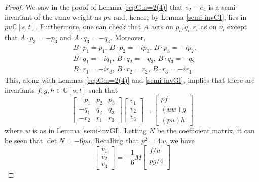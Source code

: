 \documentclass[a4paper,reqno]{amsart}
\theoremstyle{definition}
\theoremstyle{remark} \newtheorem{remark}[theorem]{Remark}
\numberwithin{equation}{section}
\begin{document}
\begin{proof}
    We saw in the proof of Lemma \ref{repG:n=2(4)} that \(e_2 - e_4\) is a semi-invariant of the same weight as \(pu\) and, hence, by Lemma \ref{semi-invGI}, lies in \(pu \mathbb{C}[s,t]\). Furthermore, one can check that \(A\) acts on \(p_i, q_i, r_i\) as on \(v_i\) except that \(A \cdot p_3 = -p_3\) and \(A\cdot q_3 = -q_3\). Moreover,
    \begin{align*}
        &B\cdot p_1 = p_1,\, B\cdot p_2 = -ip_3,\, B\cdot p_3 = -ip_2, \\
        &B\cdot q_1 = -iq_1,\, B\cdot q_2 = -q_3,\, B\cdot q_3 = -q_2 \\
        &B\cdot r_1 = -ir_3,\, B\cdot r_2 = r_2,\, B\cdot r_3 = -ir_1.
    \end{align*}
    This, along with Lemmas \ref{repG:n=2(4)} and \ref{semi-invGI}, implies that there are invariants \(f, g, h \in \mathbb{C}[s,t]\) such that 
    \begin{equation*}
        \begin{bmatrix}
            -p_1 & p_2 & p_3 \\
            -q_1 & q_2 & q_3 \\
            -r_2 & r_1 & r_3
        \end{bmatrix}
        \begin{bmatrix}
            v_1 \\
            v_2 \\
            v_3
        \end{bmatrix}
        =
        \begin{bmatrix}
            pf \\
            (uw)g \\
            (pu)h
        \end{bmatrix}
    \end{equation*}
    where \(w\) is as in Lemma \ref{semi-invGI}. Letting \(N\) be the coefficient matrix, it can be seen that \(\det N = -6pu\). Recalling that \(p^2 = 4w\), we have
    \begin{equation*}
        \begin{bmatrix}
            v_1 \\
            v_2 \\
            v_3
        \end{bmatrix}
        = -\frac{1}{6}M
        \begin{bmatrix}
            f/u \\
            pg/4 \\

\end{bmatrix}
\end{equation*}
\end{proof}
\end{document}
